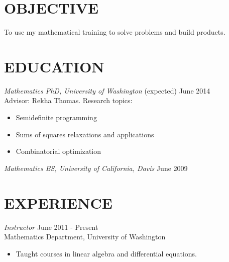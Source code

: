 \documentclass{res}
\begin{document}
 

\address{http://www.math.washington.edu/\textasciitilde jpfeiff/\\jamesrpfeiffer@gmail.com}
\address{142 21st Ave E \#3\\Seattle, WA 98112\\360-616-1403}


                                  
\begin{resume}

\section{OBJECTIVE}          
    To use my mathematical training to solve problems and build products.  

\section{EDUCATION} {\sl Mathematics PhD, University of Washington} \hfill (expected) June 2014 \\
                Advisor: Rekha Thomas. Research topics:
                 \begin{itemize}  \itemsep -2pt %
                 \item Semidefinite programming
                \item Sums of squares relaxations and applications
                \item Combinatorial optimization
                \end{itemize}
 
                {\sl Mathematics BS, University of California, Davis} \hfill            June 2009 


\section{EXPERIENCE} {\sl Instructor} \hfill June 2011 - Present\\
                Mathematics Department, University of Washington
                 \begin{itemize}  \itemsep -2pt %
                 \item Taught courses in linear algebra and differential equations.
                \end{itemize}
 

\end{resume}
\end{document}
